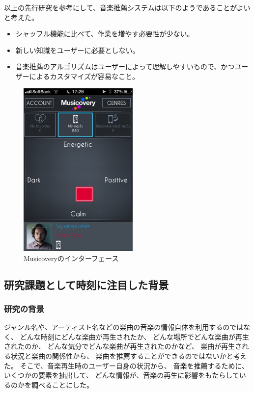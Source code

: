 \documentclass[11pt, onecolumn]{jsarticle}
\begin{document}
以上の先行研究を参考にして、音楽推薦システムは以下のようであることがよいと考えた。
\begin{itemize}
\item
シャッフル機能に比べて、作業を増やす必要性が少ない。
\item
新しい知識をユーザーに必要としない。
\item
音楽推薦のアルゴリズムはユーザーによって理解しやすいもので、かつユーザーによるカスタマイズが容易なこと。
\end{itemize}



\begin{figure}[h]
\begin{center}
\includegraphics[width=5.866cm]{musicovery.png}
\caption{Musicoveryのインターフェース}
\label{musicovery_interface}
\end{center}
\end{figure}

\subsection{研究課題として時刻に注目した背景}
\subsubsection{研究の背景}
ジャンル名や、アーティスト名などの楽曲の音楽の情報自体を利用するのではなく、
どんな時刻にどんな楽曲が再生されたか、
どんな場所でどんな楽曲が再生されたのか、
どんな気分でどんな楽曲が再生されたのかなど、
楽曲が再生される状況と楽曲の関係性から、
楽曲を推薦することができるのではないかと考えた。
そこで、音楽再生時のユーザー自身の状況から、
音楽を推薦するために、いくつかの要素を抽出して、
どんな情報が、音楽の再生に影響をもたらしているのかを調べることにした。
\end{document}
